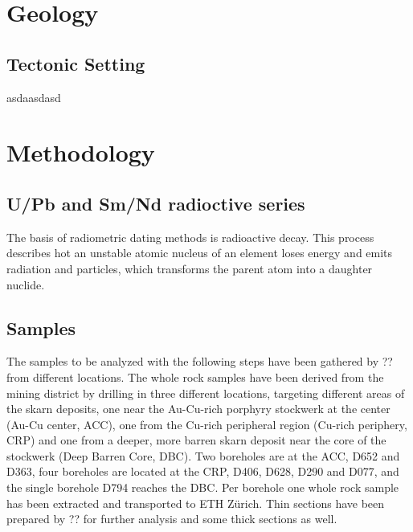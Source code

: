 \documentclass[a4paper,11pt,titlepage]{article}
\begin{document}

\vspace*{10pt}
\section{Geology}

\subsection{Tectonic Setting}
asdaasdasd


\vspace*{10pt}
\section{Methodology}

\subsection{U/Pb and Sm/Nd radioctive series}
The basis of radiometric dating methods is radioactive decay. This process describes hot an unstable atomic nucleus of an element loses energy and emits radiation and particles, which transforms the parent atom into a daughter nuclide. 

\subsection{Samples}
The samples to be analyzed with the following steps have been gathered by ?? from different locations. The whole rock samples have been derived from the mining district by drilling in three different locations, targeting different areas of the skarn deposits, one near the Au-Cu-rich porphyry stockwerk at the center (Au-Cu center, ACC), one from the Cu-rich peripheral region (Cu-rich periphery, CRP) and one from a deeper, more barren skarn deposit near the core of the stockwerk (Deep Barren Core, DBC). Two boreholes are at the ACC, D652 and D363, four boreholes are located at the CRP, D406, D628, D290 and D077, and the single borehole D794 reaches the DBC. Per borehole one whole rock sample has been extracted and transported to ETH Zürich. Thin sections have been prepared by ?? for further analysis and some thick sections as well. 
\end{document}
